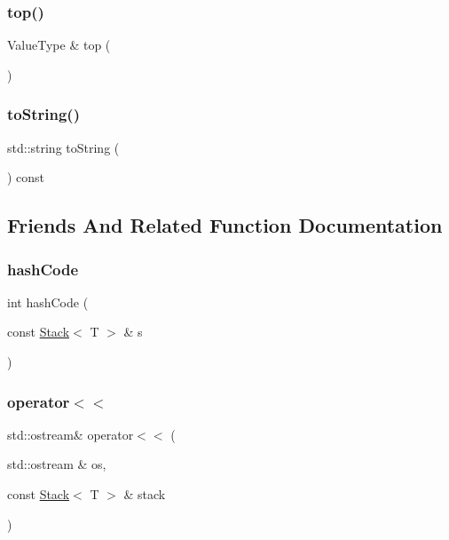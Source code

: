 \subsubsection{\texorpdfstring{top()}{top()}}
{\footnotesize\ttfamily Value\+Type \& top (\begin{DoxyParamCaption}{ }\end{DoxyParamCaption})}

\mbox{\label{classStack_a1fe5121d6528fdea3f243321b3fa3a49}} 
\subsubsection{\texorpdfstring{to\+String()}{toString()}}
{\footnotesize\ttfamily std\+::string to\+String (\begin{DoxyParamCaption}{ }\end{DoxyParamCaption}) const}



\subsection{Friends And Related Function Documentation}
\mbox{\label{classStack_add24e0ce849c0b2045c24ee3fba490ea}} 
\subsubsection{\texorpdfstring{hash\+Code}{hashCode}}
{\footnotesize\ttfamily int hash\+Code (\begin{DoxyParamCaption}\item[{const \mbox{\hyperlink{classStack}{Stack}}$<$ T $>$ \&}]{s }\end{DoxyParamCaption})\hspace{0.3cm}{\ttfamily [friend]}}

\mbox{\label{classStack_a047eaf65350ba824d7aa36c925289d9c}} 
\subsubsection{\texorpdfstring{operator$<$$<$}{operator<<}}
{\footnotesize\ttfamily std\+::ostream\& operator$<$$<$ (\begin{DoxyParamCaption}\item[{std\+::ostream \&}]{os,  }\item[{const \mbox{\hyperlink{classStack}{Stack}}$<$ T $>$ \&}]{stack }\end{DoxyParamCaption})\hspace{0.3cm}{\ttfamily [friend]}}

